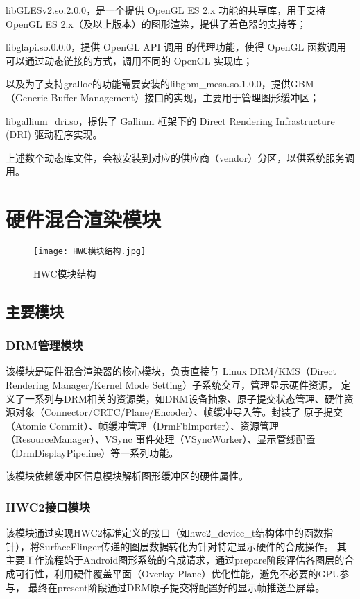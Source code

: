 libGLESv2.so.2.0.0，是一个提供 OpenGL ES 2.x 功能的共享库，用于支持 OpenGL ES 2.x（及以上版本）的图形渲染，提供了着色器的支持等；

libglapi.so.0.0.0，提供 OpenGL API 调用 的代理功能，使得 OpenGL 函数调用可以通过动态链接的方式，调用不同的 OpenGL 实现库；

以及为了支持gralloc的功能需要安装的libgbm\_mesa.so.1.0.0，提供GBM（Generic Buffer Management）接口的实现，主要用于管理图形缓冲区；

libgallium\_dri.so，提供了 Gallium 框架下的 Direct Rendering Infrastructure (DRI) 驱动程序实现。

上述数个动态库文件，会被安装到对应的供应商（vendor）分区，以供系统服务调用。

\section{硬件混合渲染模块}

\begin{figure}[h]
  \centering
  \texttt{[image: HWC模块结构.jpg]}
  \caption{HWC模块结构}
  \label{fig:HWC模块结构}
\end{figure}

\subsection{主要模块}

\subsubsection{DRM管理模块}
该模块是硬件混合渲染器的核心模块，负责直接与 Linux DRM/KMS（Direct Rendering Manager/Kernel Mode Setting）子系统交互，管理显示硬件资源，
定义了一系列与DRM相关的资源类，如DRM设备抽象、原子提交状态管理、硬件资源对象（Connector/CRTC/Plane/Encoder）、帧缓冲导入等。封装了
原子提交（Atomic Commit）、帧缓冲管理（DrmFbImporter）、资源管理（ResourceManager）、VSync 事件处理（VSyncWorker）、显示管线配置（DrmDisplayPipeline）等一系列功能。

该模块依赖缓冲区信息模块解析图形缓冲区的硬件属性。

\subsubsection{HWC2接口模块}
该模块通过实现HWC2标准定义的接口（如hwc2\_device\_t结构体中的函数指针），将SurfaceFlinger传递的图层数据转化为针对特定显示硬件的合成操作。
其主要工作流程始于Android图形系统的合成请求，通过prepare阶段评估各图层的合成可行性，利用硬件覆盖平面（Overlay Plane）优化性能，避免不必要的GPU参与，
最终在present阶段通过DRM原子提交将配置好的显示帧推送至屏幕。

